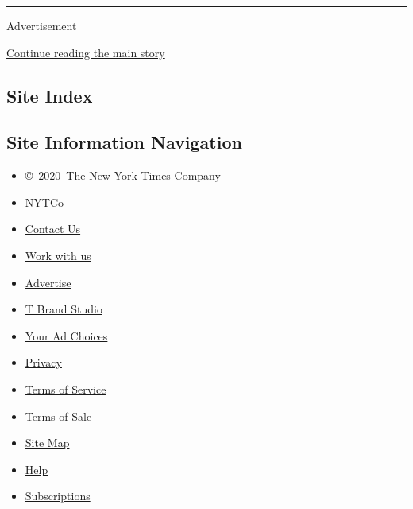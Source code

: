 \begin{center}\rule{0.5\linewidth}{\linethickness}\end{center}

Advertisement

\protect\hyperlink{after-bottom}{Continue reading the main story}

\hypertarget{site-index}{%
\subsection{Site Index}\label{site-index}}

\hypertarget{site-information-navigation}{%
\subsection{Site Information
Navigation}\label{site-information-navigation}}

\begin{itemize}
\tightlist
\item
  \href{https://help.nytimes3xbfgragh.onion/hc/en-us/articles/115014792127-Copyright-notice}{©~2020~The
  New York Times Company}
\end{itemize}

\begin{itemize}
\tightlist
\item
  \href{https://www.nytco.com/}{NYTCo}
\item
  \href{https://help.nytimes3xbfgragh.onion/hc/en-us/articles/115015385887-Contact-Us}{Contact
  Us}
\item
  \href{https://www.nytco.com/careers/}{Work with us}
\item
  \href{https://nytmediakit.com/}{Advertise}
\item
  \href{http://www.tbrandstudio.com/}{T Brand Studio}
\item
  \href{https://www.nytimes3xbfgragh.onion/privacy/cookie-policy\#how-do-i-manage-trackers}{Your
  Ad Choices}
\item
  \href{https://www.nytimes3xbfgragh.onion/privacy}{Privacy}
\item
  \href{https://help.nytimes3xbfgragh.onion/hc/en-us/articles/115014893428-Terms-of-service}{Terms
  of Service}
\item
  \href{https://help.nytimes3xbfgragh.onion/hc/en-us/articles/115014893968-Terms-of-sale}{Terms
  of Sale}
\item
  \href{https://spiderbites.nytimes3xbfgragh.onion}{Site Map}
\item
  \href{https://help.nytimes3xbfgragh.onion/hc/en-us}{Help}
\item
  \href{https://www.nytimes3xbfgragh.onion/subscription?campaignId=37WXW}{Subscriptions}
\end{itemize}
